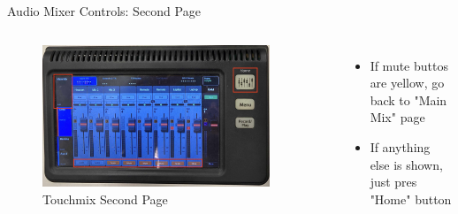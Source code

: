 \begin{frame}{Audio Mixer Controls: Second Page}
	\begin{columns}[T,onlytextwidth]
		\begin{figure} 
			\centering
			\includegraphics[width=0.9\textwidth]{images/touchmix-cam-controls.jpeg}
			\caption{Touchmix Second Page}
		\end{figure}
		\begin{itemize}
			\item If mute buttos are yellow, go back to "Main Mix" page
			\item If anything else is shown, just pres "Home" button
		\end{itemize}
	\end{columns}
\end{frame}

